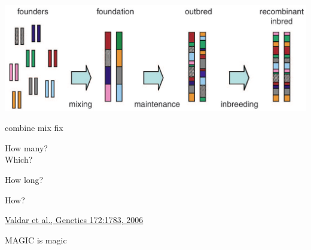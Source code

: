 \documentclass[12pt]{article}
\newcommand{\citesize}{\fontsize{14}{18} \selectfont}
\newcommand{\headsize}{\fontsize{35}{35} \selectfont}
\newcommand{\smallsize}{\fontsize{25}{30} \selectfont}
\newcommand{\smallersize}{\fontsize{20}{25} \selectfont}
\begin{document}
{\vspace{20mm}

\centerline{\includegraphics[width=10in]{Figs/valdar_genet2006.png}}

\smallsize \color{myyellow}
\hspace*{52mm} combine \hspace*{35mm} mix \hspace*{52mm} fix

\smallersize
\color{mywhite}
\vspace{20pt}

\hspace*{6mm}
\begin{minipage}[t]{45mm}
\vspace*{0mm}
\centering

How many? \\[20pt]
Which?
\end{minipage}
\hspace{57mm}
\begin{minipage}[t]{45mm}
\vspace*{0mm}
\centering

How long?
\end{minipage}
\hspace{18mm}
\begin{minipage}[t]{45mm}
\vspace*{0mm}
\centering

How?
\end{minipage}


\vfill

\hfill {\citesize \color{citecolor} \href{http://www.genetics.org/content/172/3/1783.full}{Valdar et al., Genetics 172:1783, 2006}}

\vspace*{5mm}


\newpage

\headsize \color{myyellow}
\hfill \begin{minipage}{5.75in}
\centering
MAGIC is magic
\end{minipage}

}
\end{document}
